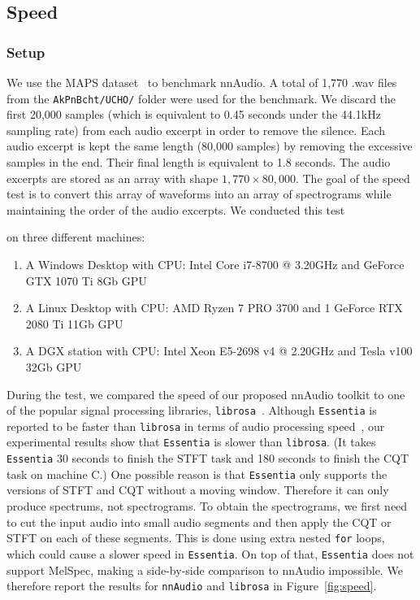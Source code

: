 \documentclass{ieeeaccess}
\newcommand{\nbh}[1]{\texttt{#1}}
\begin{document}
\subsection{Speed}\label{subsec: speed}

\subsubsection{Setup}\label{subsec: spec}
We use the MAPS dataset~\cite{emiya2010maps} to benchmark nnAudio. A total of 1,770 .wav files from the \nbh{AkPnBcht/UCHO/} folder were used for the benchmark. We discard the first 20,000 samples (which is equivalent to 0.45 seconds under the 44.1kHz sampling rate) from each audio excerpt in order to remove the silence. Each audio excerpt is kept the same length (80,000 samples) by removing the excessive samples in the end. Their final length is equivalent to 1.8 seconds. The audio excerpts are stored as an array with shape $1,770 \times 80,000$. The goal of the speed test is to convert this array of waveforms into an array of spectrograms while maintaining the order of the audio excerpts. We conducted this test {on three different machines:
\begin{enumerate}[label=(\Alph*)]
  \item A Windows Desktop with CPU: Intel Core i7-8700 @ 3.20GHz and GeForce GTX 1070 Ti 8Gb GPU
  \item A Linux Desktop with CPU: AMD Ryzen 7 PRO 3700 and 1 GeForce RTX 2080 Ti 11Gb GPU
  \item A DGX station with CPU: Intel Xeon E5-2698 v4 @ 2.20GHz and Tesla v100 32Gb GPU
\end{enumerate}}
During the test, we compared the speed of our proposed nnAudio toolkit to one of the popular signal processing libraries, \nbh{librosa}~\cite{mcfee2015Librosa}. Although \nbh{Essentia} is reported to be faster than \nbh{librosa} in terms of audio processing speed~\cite{moffat2015evaluation}, our experimental results show that \nbh{Essentia} is slower than \nbh{librosa}. (It takes \nbh{Essentia} 30 seconds to finish the STFT task and 180 seconds to finish the CQT task on machine C.) One possible reason is that \nbh{Essentia} only supports the versions of STFT and CQT without a moving window. Therefore it can only produce spectrums, not spectrograms. To obtain the spectrograms, we first need to cut the input audio into small audio segments and then apply the CQT or STFT on each of these segments. This is done using extra nested \nbh{for} loops, which could cause a slower speed in \nbh{Essentia}. On top of that, \nbh{Essentia} does not support MelSpec, making a side-by-side comparison to nnAudio impossible. We therefore report the results for \nbh{nnAudio} and \nbh{librosa} in Figure~\ref{fig:speed}.
\end{document}
